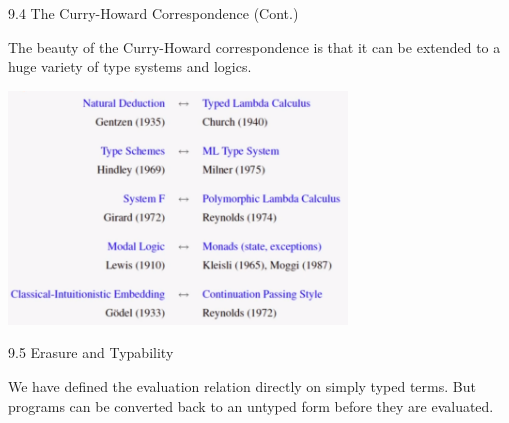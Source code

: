 \documentclass[table]{beamer}
\begin{document}
\begin{frame}[t]{9.4 The Curry-Howard Correspondence (Cont.)} \vspace{10pt}

The beauty of the Curry-Howard correspondence is that it can be extended to a huge variety of type systems and logics. 



\begin{center}
\includegraphics[width=9cm]{curryhowardcorrespondence_wadler_ch9}
\end{center}

\end{frame}

\begin{frame}[t]{9.5 Erasure and Typability} \vspace{10pt}

We have defined the evaluation relation directly on simply typed terms. But programs can be converted back to an untyped form before they are evaluated. 

\vspace{10pt}

\end{frame}
\end{document}

